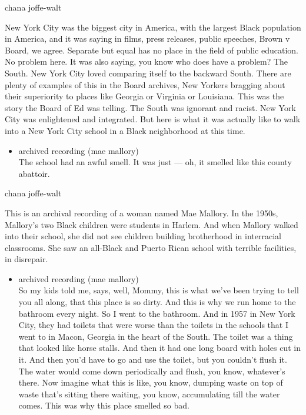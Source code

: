 chana joffe-walt

New York City was the biggest city in America, with the largest Black
population in America, and it was saying in films, press releases,
public speeches, Brown v Board, we agree. Separate but equal has no
place in the field of public education. No problem here. It was also
saying, you know who does have a problem? The South. New York City loved
comparing itself to the backward South. There are plenty of examples of
this in the Board archives, New Yorkers bragging about their superiority
to places like Georgia or Virginia or Louisiana. This was the story the
Board of Ed was telling. The South was ignorant and racist. New York
City was enlightened and integrated. But here is what it was actually
like to walk into a New York City school in a Black neighborhood at this
time.

\begin{itemize}
\tightlist
\item
  archived recording (mae mallory)\\
  The school had an awful smell. It was just --- oh, it smelled like
  this county abattoir.
\end{itemize}

chana joffe-walt

This is an archival recording of a woman named Mae Mallory. In the
1950s, Mallory's two Black children were students in Harlem. And when
Mallory walked into their school, she did not see children building
brotherhood in interracial classrooms. She saw an all-Black and Puerto
Rican school with terrible facilities, in disrepair.

\begin{itemize}
\tightlist
\item
  archived recording (mae mallory)\\
  So my kids told me, says, well, Mommy, this is what we've been trying
  to tell you all along, that this place is so dirty. And this is why we
  run home to the bathroom every night. So I went to the bathroom. And
  in 1957 in New York City, they had toilets that were worse than the
  toilets in the schools that I went to in Macon, Georgia in the heart
  of the South. The toilet was a thing that looked like horse stalls.
  And then it had one long board with holes cut in it. And then you'd
  have to go and use the toilet, but you couldn't flush it. The water
  would come down periodically and flush, you know, whatever's there.
  Now imagine what this is like, you know, dumping waste on top of waste
  that's sitting there waiting, you know, accumulating till the water
  comes. This was why this place smelled so bad.
\end{itemize}

